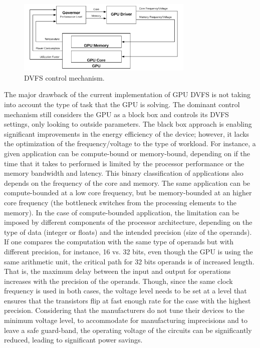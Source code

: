 \begin{figure}[!htb]
  \centering
  \includegraphics[width=0.75\textwidth]{Figures/StateArt/DVFS.png}
  \caption[Controller]{DVFS control mechanism.}
  \label{fig:DVFSmechanism}
\end{figure}

The major drawback of the current implementation of GPU DVFS is not taking into account the type of task that the GPU is solving. The dominant control mechanism still considers the GPU as a block box and controls its DVFS settings, only looking to outside parameters. The black box approach is enabling significant improvements in the energy efficiency of the device; however, it lacks the optimization of the frequency/voltage to the type of workload. For instance, a given application can be compute-bound or memory-bound, depending on if the time that it takes to performed is limited by the processor performance or the memory bandwidth and latency. This binary classification of applications also depends on the frequency of the core and memory. The same application can be compute-bounded at a low core frequency, but be memory-bounded at an higher core frequency \cite{guerreiro_dvfs-aware_2019} (the bottleneck switches from the processing elements to the memory). In the case of compute-bounded application, the limitation can be imposed by different components of the processor architecture, depending on the type of data (integer or floats) and the intended precision (size of the operands). If one compares the computation with the same type of operands but with different precision, for instance, 16 vs. 32 bits, even though the GPU is using the same arithmetic unit, the critical path for 32 bits operands is of increased length. That is, the maximum delay between the input and output for operations increases with the precision of the operands. Though, since the same clock frequency is used in both cases, the voltage level needs to be set at a level that ensures that the transistors flip at fast enough rate for the case with the highest precision. Considering that the manufacturers do not tune their devices to the minimum voltage level, to accommodate for manufacturing imprecisions and to leave a safe guard-band, the operating voltage of the circuits can be significantly reduced, leading to significant power savings. 

